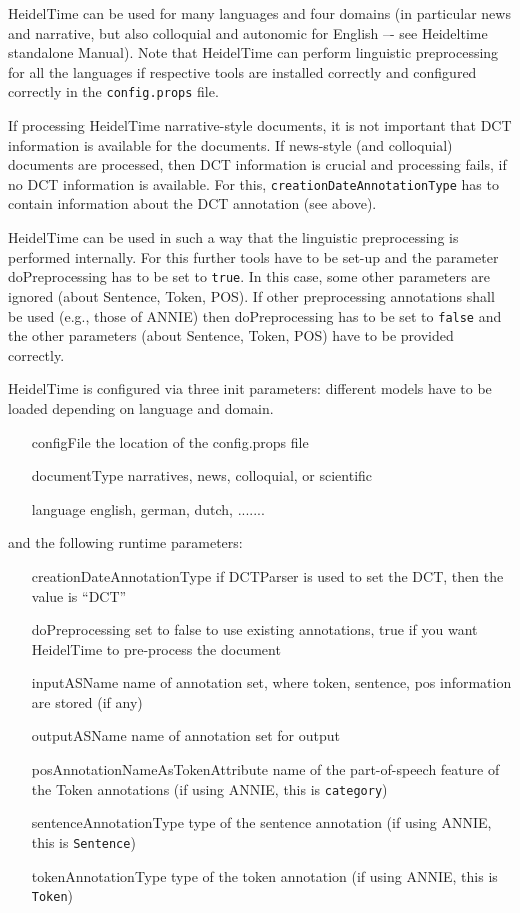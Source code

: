 HeidelTime can be used for many languages and four domains (in particular news
and narrative, but also colloquial and autonomic for English –- see
Heideltime standalone Manual). Note that HeidelTime can perform linguistic
preprocessing for all the languages if respective tools are installed correctly
and configured correctly in the \verb!config.props! file. 

If processing HeidelTime narrative-style documents, it is not important that
DCT information is available for the documents. If news-style (and colloquial)
documents are processed, then DCT information is crucial and processing fails,
if no DCT information is available. For this, \verb!creationDateAnnotationType!
has to contain information about the DCT annotation (see above).

HeidelTime can be used in such a way that the linguistic preprocessing is
performed internally. For this further tools have to be set-up and the
parameter doPreprocessing has to be set to \verb!true!. In this case, some
other parameters are ignored (about Sentence, Token, POS).  If other
preprocessing annotations shall be used (e.g., those of ANNIE) then
doPreprocessing has to be set to \verb!false! and the other parameters (about
Sentence, Token, POS) have to be provided correctly.

HeidelTime is configured via three init parameters:
different models have to be loaded depending on language and domain.

\begin{itemize}
\item[configFile] the location of the config.props file
\item[documentType] narratives, news, colloquial, or scientific
\item[language] english, german, dutch, .......
\end{itemize}

and the following runtime parameters:

\begin{itemize}
\item[creationDateAnnotationType] if DCTParser is used to set the DCT, then the value is ``DCT''
\item[doPreprocessing] set to false to use existing annotations, true if you want HeidelTime to pre-process the document
\item[inputASName] name of annotation set, where token, sentence, pos information are stored (if any)
\item[outputASName] name of annotation set for output
\item[posAnnotationNameAsTokenAttribute] name of the part-of-speech feature of the Token annotations (if using ANNIE, this is \verb!category!)
\item[sentenceAnnotationType] type of the sentence annotation (if using ANNIE, this is \verb!Sentence!)
\item[tokenAnnotationType] type of the token annotation (if using ANNIE, this is \verb!Token!)
\end{itemize}

